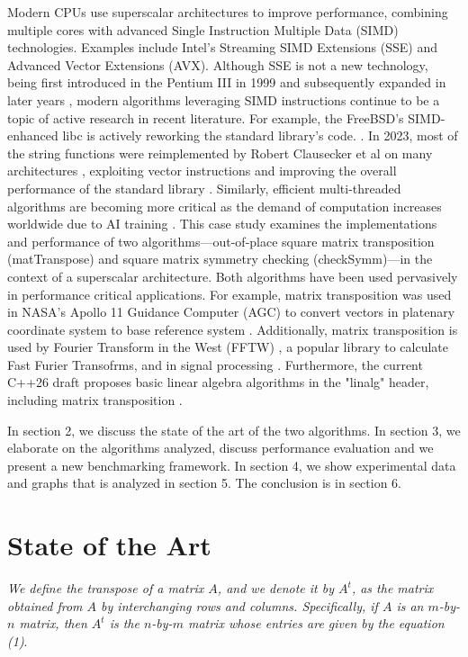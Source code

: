 \documentclass[conference]{IEEEtran}
\begin{document}
Modern CPUs use superscalar architectures to improve performance, combining multiple cores with advanced Single Instruction Multiple Data (SIMD) technologies. Examples include Intel's Streaming SIMD Extensions (SSE) and Advanced Vector Extensions (AVX). Although SSE is not a new technology, being first introduced in the Pentium III in 1999 and subsequently expanded in later years \cite{b1}, modern algorithms leveraging SIMD instructions continue to be a topic of active research in recent literature.
For example, the FreeBSD's SIMD-enhanced libc is actively reworking the standard library's code. \cite{b2}.
In 2023, most of the string functions were reimplemented by Robert Clausecker et al on many architectures \cite{b3}, exploiting vector instructions and improving the overall performance of the standard library \cite{b4}.
Similarly, efficient multi-threaded algorithms are becoming more critical as the demand of computation increases worldwide due to AI training \cite{b5} \cite{b6}.
This case study examines the implementations and performance of two algorithms—out-of-place square matrix transposition (matTranspose) and square matrix symmetry checking (checkSymm)—in the context of a superscalar architecture. Both algorithms have been used pervasively in performance critical applications. For example, matrix transposition was used in NASA's Apollo 11 Guidance Computer (AGC) to convert vectors in platenary coordinate system to base reference system \cite{b7}. Additionally, matrix transposition is used by Fourier Transform in the West (FFTW) \cite{b8}, a popular library to calculate Fast Furier Transofrms, and in signal processing \cite{b9}. Furthermore, the current C++26 draft proposes basic linear algebra algorithms in the "linalg" header, including matrix transposition \cite{b10}.

In section 2, we discuss the state of the art of the two algorithms.
In section 3, we elaborate on the algorithms analyzed, discuss performance evaluation and we present a new benchmarking framework.
In section 4, we show experimental data and graphs that is analyzed
in section 5. The conclusion is in section 6.


\section{State of the Art}

\textit{We define the transpose of a matrix $A$, and we denote it by $A^t$, as the matrix obtained from $A$ by interchanging rows and columns. Specifically, if $A$ is an $m$-by-$n$ matrix, then $A^t$ is the $n$-by-$m$ matrix whose entries are given by the equation (1)}. \cite{b11}
\end{document}
